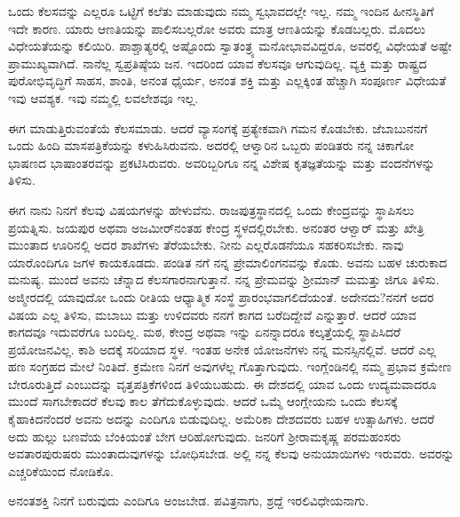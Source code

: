 \vspace{0.2cm}

ಒಂದು ಕೆಲಸವನ್ನು ಎಲ್ಲರೂ ಒಟ್ಟಿಗೆ ಕಲೆತು ಮಾಡುವುದು ನಮ್ಮ ಸ್ವಭಾವದಲ್ಲೇ ಇಲ್ಲ. ನಮ್ಮ ಇಂದಿನ ಹೀನಸ್ಥಿತಿಗೆ ಇದೇ ಕಾರಣ. ಯಾರು ಆಣತಿಯನ್ನು ಪಾಲಿಸಬಲ್ಲರೋ ಅವರು ಮಾತ್ರ ಆಣತಿಯನ್ನು ಕೊಡಬಲ್ಲರು. ಮೊದಲು ವಿಧೇಯತೆಯನ್ನು ಕಲಿಯಿರಿ. ಪಾಶ್ಚಾತ್ಯರಲ್ಲಿ ಅಷ್ಟೊಂದು ಸ್ವಾತಂತ್ರ್ಯ ಮನೋಭಾವವಿದ್ದರೂ, ಅವರಲ್ಲಿ ವಿಧೇಯತೆ ಅಷ್ಟೇ ಪ್ರಾಮುಖ್ಯವಾಗಿದೆ. ನಾನೆಲ್ಲ ಸ್ವಪ್ರತಿಷ್ಠೆಯ ಜನ. ಇದರಿಂದ ಯಾವ ಕೆಲಸವೂ ಆಗುವುದಿಲ್ಲ. ವ್ಯಕ್ತಿ ಮತ್ತು ರಾಷ್ಟ್ರದ ಪುರೋಭಿವೃದ್ಧಿಗೆ ಸಾಹಸ, ಶಾಂತಿ, ಅನಂತ ಧೈರ್ಯ, ಅನಂತ ಶಕ್ತಿ ಮತ್ತು ಎಲ್ಲಕ್ಕಿಂತ ಹೆಚ್ಚಾಗಿ ಸಂಪೂರ್ಣ ವಿಧೇಯತೆ \enginline{-} ಇವು ಆವಶ್ಯಕ. ಇವು ನಮ್ಮಲ್ಲಿ ಲವಲೇಶವೂ ಇಲ್ಲ.
\vspace{0.2cm}

ಈಗ ಮಾಡುತ್ತಿರುವಂತೆಯೆ ಕೆಲಸಮಾಡು. ಆದರೆ ವ್ಯಾಸಂಗಕ್ಕೆ ಪ್ರತ್ಯೇಕವಾಗಿ ಗಮನ ಕೊಡಬೇಕು. ಜೆ\enginline{-}ಬಾಬುನನಗೆ ಒಂದು ಹಿಂದಿ ಮಾಸಪತ್ರಿಕೆಯನ್ನು ಕಳುಹಿಸಿರುವನು. ಅದರಲ್ಲಿ ಆಳ್ವಾರಿನ ಒಬ್ಬರು ಪಂಡಿತರು ನನ್ನ ಚಿಕಾಗೋ ಭಾಷಣದ ಭಾಷಾಂತರವನ್ನು ಪ್ರಕಟಿಸಿರುವರು. ಅವರಿಬ್ಬರಿಗೂ ನನ್ನ ವಿಶೇಷ ಕೃತಜ್ಞತೆಯನ್ನು ಮತ್ತು ವಂದನೆಗಳನ್ನು ತಿಳಿಸು.
\vspace{0.2cm}

ಈಗ ನಾನು ನಿನಗೆ ಕೆಲವು ವಿಷಯಗಳನ್ನು ಹೇಳುವೆನು. ರಾಜಪುತ್ರಸ್ಥಾನದಲ್ಲಿ ಒಂದು ಕೇಂದ್ರವನ್ನು ಸ್ಥಾಪಿಸಲು ಪ್ರಯತ್ನಿಸು. ಜಯಪುರ ಅಥವಾ ಅಜಮೀರ್‌ನಂತಹ ಕೇಂದ್ರ ಸ್ಥಳದಲ್ಲಿರಬೇಕು. ಅನಂತರ ಆಳ್ವಾರ್ ಮತ್ತು ಖೇತ್ರಿ ಮುಂತಾದ ಊರಿನಲ್ಲಿ ಅದರ ಶಾಖೆಗಳು ತೆರೆಯಬೇಕು. ನೀನು ಎಲ್ಲರೊಡನೆಯೂ ಸಹಕರಿಸಬೇಕು. ನಾವು ಯಾರೊಂದಿಗೂ ಜಗಳ ಕಾಯಕೂಡದು. ಪಂಡಿತ ನ\enginline{-}ಗೆ ನನ್ನ ಪ್ರೇಮಾಲಿಂಗನವನ್ನು ಕೊಡು. ಅವನು ಬಹಳ ಚುರುಕಾದ ಮನುಷ್ಯ. ಮುಂದೆ ಅವನು ಚೆನ್ನಾದ ಕೆಲಸಗಾರನಾಗುತ್ತಾನೆ. ನನ್ನ ಪ್ರೇಮವನ್ನು ಶ‍್ರೀಮಾನ್ ಮ\enginline{-}ಮತ್ತು ಜಿ\enginline{-}ಗೂ ತಿಳಿಸು. ಅಜ್ಮೀರದಲ್ಲಿ ಯಾವುದೋ ಒಂದು ರೀತಿಯ ಆಧ್ಯಾತ್ಮಿಕ ಸಂಸ್ಥೆ ಪ್ರಾರಂಭವಾಗಲಿದೆಯಂತೆ. ಅದೇನದು?ನನಗೆ ಅದರ ವಿಷಯ ಎಲ್ಲ ತಿಳಿಸು, ಮ\enginline{-}ಬಾಬು ಮತ್ತು ಉಳಿದವರು ನನಗೆ ಕಾಗದ ಬರೆದಿದ್ದೇವೆ ಎನ್ನುತ್ತಾರೆ. ಆದರೆ ಯಾವ ಕಾಗದವೂ ಇದುವರೆಗೂ ಬಂದಿಲ್ಲ. ಮಠ, ಕೇಂದ್ರ ಅಥವಾ ಇನ್ನು ಏನನ್ನಾದರೂ ಕಲ್ಕತ್ತೆಯಲ್ಲಿ ಸ್ಥಾಪಿಸಿದರೆ ಪ್ರಯೋಜನವಿಲ್ಲ. ಕಾಶಿ ಅದಕ್ಕೆ ಸರಿಯಾದ ಸ್ಥಳ. ಇಂತಹ ಅನೇಕ ಯೋಜನೆಗಳು ನನ್ನ ಮನಸ್ಸಿನಲ್ಲಿವೆ. ಆದರೆ ಎಲ್ಲ ಹಣ ಸಂಗ್ರಹದ ಮೇಲೆ ನಿಂತಿದೆ. ಕ್ರಮೇಣ ನಿನಗೆ ಅವುಗಳೆಲ್ಲ ಗೊತ್ತಾಗುವುದು. ಇಂಗ್ಲೆಂಡಿನಲ್ಲಿ ನಮ್ಮ ಪ್ರಭಾವ ಕ್ರಮೇಣ ಬೇರೂರುತ್ತಿದೆ ಎಂಬುದನ್ನು ವೃತ್ತಪತ್ರಿಕೆಗಳಿಂದ ತಿಳಿಯಬಹುದು. ಈ ದೇಶದಲ್ಲಿ ಯಾವ ಒಂದು ಉದ್ಯಮವಾದರೂ ಮುಂದೆ ಸಾಗಬೇಕಾದರೆ ಕೆಲವು ಕಾಲ ತೆಗೆದುಕೊಳ್ಳುವುದು. ಆದರೆ ಒಮ್ಮೆ ಆಂಗ್ಲೇಯನು ಒಂದು ಕೆಲಸಕ್ಕೆ ಕೈಹಾಕಿದನೆಂದರೆ ಅವನು ಅದನ್ನು ಎಂದಿಗೂ ಬಿಡುವುದಿಲ್ಲ. ಅಮೆರಿಕಾ ದೇಶದವರು ಬಹಳ ಉತ್ಸಾಹಿಗಳು. ಆದರೆ ಅದು ಹುಲ್ಲು ಬಣವೆಯ ಬೆಂಕಿಯಂತೆ ಬೇಗ ಆರಿಹೋಗುವುದು. ಜನರಿಗೆ ಶ‍್ರೀರಾಮಕೃಷ್ಣ ಪರಮಹಂಸರು ಅವತಾರಪುರುಷರು ಮುಂತಾದುವುಗಳನ್ನು ಬೋಧಿಸಬೇಡ. ಅಲ್ಲಿ ನನ್ನ ಕೆಲವು ಅನುಯಾಯಿಗಳು ಇರುವರು. ಅವರನ್ನು ಎಚ್ಚರಿಕೆಯಿಂದ ನೋಡಿಕೊ.

\vspace{0.1cm}

ಅನಂತಶಕ್ತಿ ನಿನಗೆ ಬರುವುದು\enginline{-} ಎಂದಿಗೂ ಅಂಜಬೇಡ. ಪವಿತ್ರನಾಗು, ಶ್ರದ್ದೆ ಇರಲಿ\enginline{-}ವಿಧೇಯನಾಗು.

